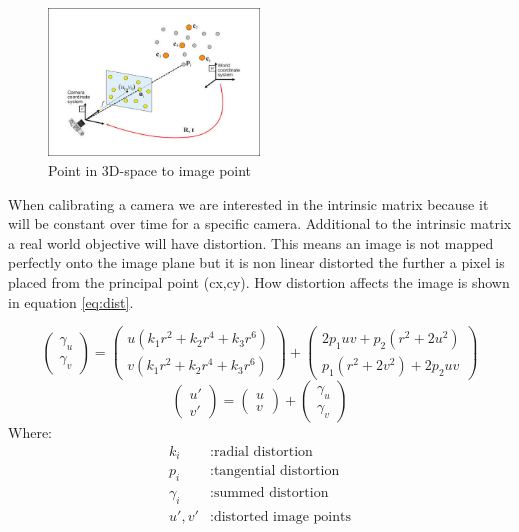 \documentclass[11pt,a4paper,titlepage,oneside]{report}
\begin{document}
\begin{figure}[H]
  \begin{center}
    \includegraphics[width=0.5\textwidth]{img/pnp.jpg}
  \end{center}
    \caption{Point in 3D-space to image point}\label{fig:projection}
\end{figure}

When calibrating a camera we are interested in the intrinsic matrix because it will be constant over time for a specific camera. Additional to the intrinsic matrix a real world objective will have distortion. This means an image is not mapped perfectly onto the image plane but it is non linear distorted the further a pixel is placed from the principal point (cx,cy). How distortion affects the image is shown in equation \ref{eq:dist}.

\begin{equation}\label{eq:dist}
	\begin{pmatrix}\gamma_{u} \\
	  \gamma_{v}
	\end{pmatrix}=\begin{pmatrix}
	  u(k_1r^2+k_2r^4+k_3r^6)\\
	  v(k_1r^2+k_2r^4+k_3r^6)
	\end{pmatrix}+\begin{pmatrix}
	  2p_1uv+p_2(r^2+2u^2)\\
	  p_1(r^2+2v^2)+2p_2uv
	\end{pmatrix}
\end{equation}
\begin{equation}\label{eq:pdist}
\begin{pmatrix}u'\\v'\end{pmatrix}=\begin{pmatrix}
u\\v\end{pmatrix}+\begin{pmatrix}\gamma_{u}\\\gamma_{v}\end{pmatrix}
\end{equation}
Where:
\begin{align*}
  k_{i}		&: \text{radial distortion}\\
  p_{i}	    	&: \text{tangential distortion}\\
  \gamma_{i}	&: \text{summed distortion}\\
  u',v'		&: \text{distorted image points}
\end{align*}
\end{document}
